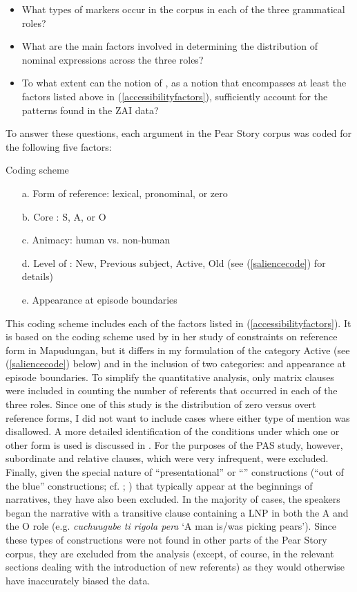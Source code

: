 \begin{itemize}

\item What types of  markers occur in the corpus in each of the three grammatical roles? 
\item What are the main  factors involved in determining the distribution of nominal expressions across the three roles? 
\item To what extent can the notion of , as a notion that encompasses at least the factors listed above in (\ref{accessibilityfactors}), sufficiently account for the patterns found in the ZAI data?
\end{itemize}
To answer these questions, each argument in the Pear Story corpus was coded for the following five factors:

\ea Coding scheme

\begin{itemize}
\item[a.] Form of reference: lexical, pronominal, or zero
\item[b.] Core : S, A, or O
\item[c.] Animacy: human vs. non-human
\item[d.] Level of : New, Previous subject, Active, Old (see (\ref{saliencecode}) for details)
\item[e.] Appearance at episode boundaries
\end{itemize}
\z

This coding scheme includes each of the  factors listed in (\ref{accessibilityfactors}). It is based on the coding scheme used by \citet{arnold2003} in her study of constraints on reference form in Mapudungan, but it differs in my formulation of the category Active (see (\ref{saliencecode}) below) and in the inclusion of two categories:  and appearance at episode boundaries. To simplify the quantitative analysis, only matrix clauses were included in counting the number of referents that occurred in each of the three roles. Since one  of this study is the distribution of zero versus overt  reference forms, I did not want to include cases where either type of mention was disallowed. A more detailed identification of the conditions under which one or other form is used is discussed in . For the purposes of the PAS study, however, subordinate and relative clauses, which were very infrequent, were excluded. Finally, given the special nature of ``presentational'' or ``'' constructions (``out of the blue'' constructions; cf. ; ) that typically appear at the beginnings of narratives, they have also been excluded. In the majority of cases, the speakers began the narrative with a transitive clause containing a LNP in both the A and the O role (e.g. \textit{cuchuugube ti rigola pera} `A man is/was picking pears'). Since these types of constructions were not found in other parts of the Pear Story corpus, they are excluded from the analysis (except, of course, in the relevant sections dealing with the introduction of new referents) as they would otherwise have inaccurately biased the data.


